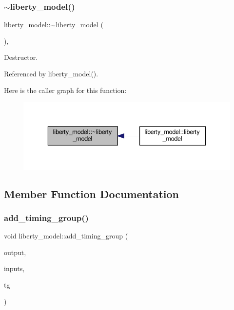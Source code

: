 \subsubsection{\texorpdfstring{$\sim$liberty\+\_\+model()}{~liberty\_model()}}
{\footnotesize\ttfamily liberty\+\_\+model\+::$\sim$liberty\+\_\+model (\begin{DoxyParamCaption}{ }\end{DoxyParamCaption})\hspace{0.3cm}{\ttfamily [override]}, {\ttfamily [default]}}



Destructor. 



Referenced by liberty\+\_\+model().

Here is the caller graph for this function\+:
\nopagebreak
\begin{figure}[H]
\begin{center}
\leavevmode
\includegraphics[width=336pt]{d0/dae/classliberty__model_adbd9cd5623f351c59d62e07e36a9254f_icgraph}
\end{center}
\end{figure}


\subsection{Member Function Documentation}
\mbox{\label{classliberty__model_a446d66ba13043a60d0fe9a5579a7327b}} 
\subsubsection{\texorpdfstring{add\+\_\+timing\+\_\+group()}{add\_timing\_group()}}
{\footnotesize\ttfamily void liberty\+\_\+model\+::add\+\_\+timing\+\_\+group (\begin{DoxyParamCaption}\item[{const std\+::string \&}]{output,  }\item[{const \hyperlink{classCustomOrderedSet}{Custom\+Ordered\+Set}$<$ std\+::string $>$ \&}]{inputs,  }\item[{const \hyperlink{timing__group_8hpp_a343803fe4e1a65fd6b57b504c2ed67ca}{timing\+\_\+group\+Ref} \&}]{tg }\end{DoxyParamCaption})}



